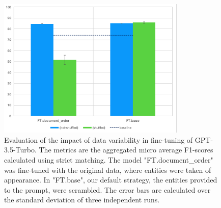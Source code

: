 \begin{figure}[htbp]
  \centering
  \includegraphics[width=0.8\textwidth]{figures/re-eval-ft.png} 
  \caption{Evaluation of the impact of data variability in fine-tuning of GPT-3.5-Turbo. The metrics are the aggregated micro average F1-scores calculated using strict matching. The model "FT.document\_order" was fine-tuned with the original data, where entities were taken of appearance. In "FT.base", our default strategy, the entities provided to the prompt, were scrambled. The error bars are calculated over the standard deviation of three independent runs.}
  \label{fig:re-eval-ft}
\end{figure}

\clearpage

\appendix


